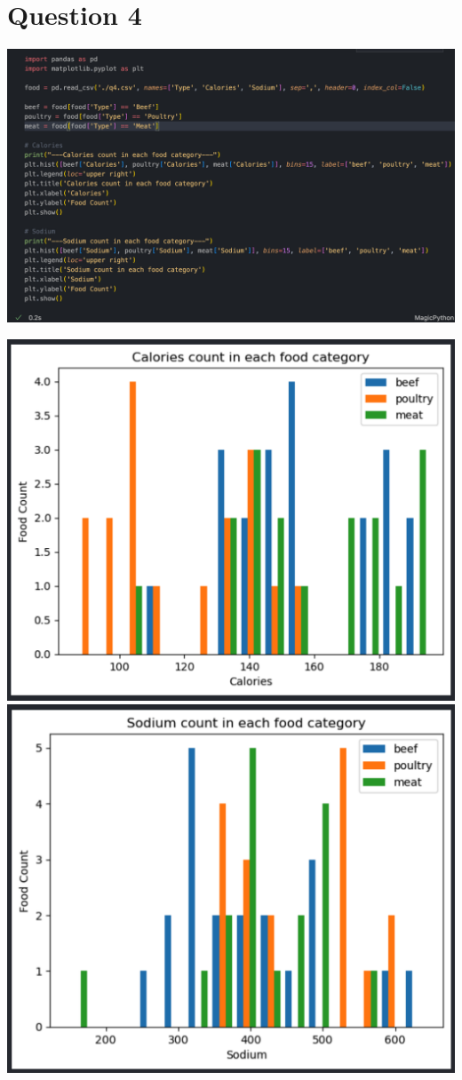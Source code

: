 \documentclass{report}
\begin{document}
\newpage

\section*{Question 4}
    \includegraphics*[scale=0.4]{q4.png}
    
    \includegraphics*[scale=0.3]{q4_plot1.png}
    \includegraphics*[scale=0.3]{q4_plot2.png}
\end{document}
